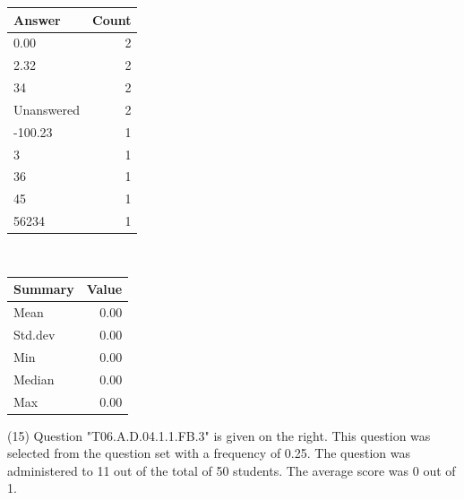 \documentclass[12pt,english,nohyper]{tufte-handout}\usepackage[]{graphicx}\usepackage[]{color}
\begin{document}
\begin{center}%
\begin{tabular}{lr}
  \hline
Answer & Count \\ 
  \hline
0.00 &   2 \\ 
  2.32 &   2 \\ 
  34 &   2 \\ 
  Unanswered &   2 \\ 
  -100.23 &   1 \\ 
  3 &   1 \\ 
  36 &   1 \\ 
  45 &   1 \\ 
  56234 &   1 \\ 
   \hline
\end{tabular}
~~~~~~~~%
\begin{tabular}{lr}
  \hline
Summary & Value \\ 
  \hline
Mean & 0.00 \\ 
  Std.dev & 0.00 \\ 
  Min & 0.00 \\ 
  Median & 0.00 \\ 
  Max & 0.00 \\ 
   \hline
\end{tabular}
\end{center}\newpage{} (15) Question "T06.A.D.04.1.1.FB.3" is given on the right. This question was selected from the question set with a frequency of 0.25. The question was administered to 11 out of the total of 50 students. The average score was 0 out of 1.
\end{document}

